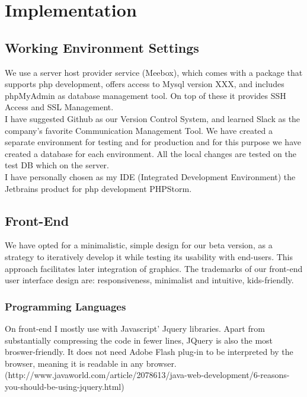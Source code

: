 \chapter{Implementation}

\section{Working Environment Settings} 

We use a server host provider service (Meebox), which comes with a package that supports php development, offers access to Mysql version XXX, and includes phpMyAdmin as database management tool. On top of these it provides SSH Access and SSL Management.\\

I have suggested Github as our Version Control System, and learned Slack as the company's favorite Communication Management Tool. 
We have created a separate environment for testing and for production and for this purpose we have created a database for each environment. All the local changes are tested on the test DB which on the server.\\

I have personally chosen as my IDE (Integrated Development Environment) the Jetbrains product for php development PHPStorm.

\section{Front-End}

We have opted for a minimalistic, simple design for our beta version, as a strategy to iteratively develop it while testing its usability with end-users. This approach facilitates later integration of graphics. The trademarks of our front-end user interface design are: responsiveness, minimalist and intuitive, kids-friendly.\\

\subsection{Programming Languages} 

On front-end I mostly use with Javascript' Jquery libraries. Apart from substantially compressing the code in fewer lines, JQuery is also the most broswer-friendly. It does not need Adobe Flash plug-in to be interpreted by the browser, meaning it is readable in any browser. (http://www.javaworld.com/article/2078613/java-web-development/6-reasons-you-should-be-using-jquery.html)
\\


